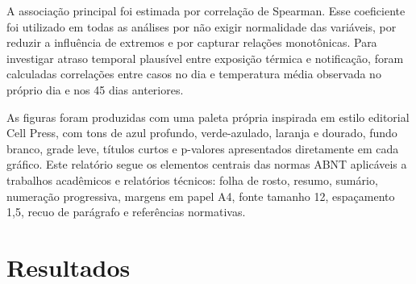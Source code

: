 \documentclass[
  12pt,
]{article}
\begin{document}
A associação principal foi estimada por correlação de Spearman. Esse
coeficiente foi utilizado em todas as análises por não exigir
normalidade das variáveis, por reduzir a influência de extremos e por
capturar relações monotônicas. Para investigar atraso temporal plausível
entre exposição térmica e notificação, foram calculadas correlações
entre casos no dia e temperatura média observada no próprio dia e nos 45
dias anteriores.

As figuras foram produzidas com uma paleta própria inspirada em estilo
editorial Cell Press, com tons de azul profundo, verde-azulado, laranja
e dourado, fundo branco, grade leve, títulos curtos e p-valores
apresentados diretamente em cada gráfico. Este relatório segue os
elementos centrais das normas ABNT aplicáveis a trabalhos acadêmicos e
relatórios técnicos: folha de rosto, resumo, sumário, numeração
progressiva, margens em papel A4, fonte tamanho 12, espaçamento 1,5,
recuo de parágrafo e referências normativas.

\section{Resultados}\label{resultados}
\end{document}
